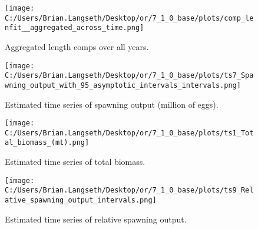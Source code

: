 \documentclass[11pt,
  english,
  a4paper,
]{article}
\begin{document}
\tagmcend\tagstructend


\begin{figure}
\centering
\texttt{[image: C:/Users/Brian.Langseth/Desktop/or/7\_1\_0\_base/plots/comp\_lenfit\_\_aggregated\_across\_time.png]}
\caption{Aggregated length comps over all years.\label{fig:agg-len-fit}}
\end{figure}

\tagmcend\tagstructend


\begin{figure}
\centering
\texttt{[image: C:/Users/Brian.Langseth/Desktop/or/7\_1\_0\_base/plots/ts7\_Spawning\_output\_with\_95\_asymptotic\_intervals\_intervals.png]}
\caption{Estimated time series of spawning output (million of eggs).\label{fig:ssb}}
\end{figure}

\tagmcend\tagstructend


\begin{figure}
\centering
\texttt{[image: C:/Users/Brian.Langseth/Desktop/or/7\_1\_0\_base/plots/ts1\_Total\_biomass\_(mt).png]}
\caption{Estimated time series of total biomass.\label{fig:tot-bio}}
\end{figure}

\tagmcend\tagstructend


\begin{figure}
\centering
\texttt{[image: C:/Users/Brian.Langseth/Desktop/or/7\_1\_0\_base/plots/ts9\_Relative\_spawning\_output\_intervals.png]}
\caption{Estimated time series of relative spawning output.\label{fig:depl}}
\end{figure}

\tagmcend\tagstructend

\end{document}
